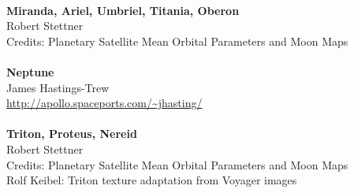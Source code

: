 \documentclass[Orbiter User Manual.tex]{subfiles}
\begin{document}
\\
\textbf{Miranda, Ariel, Umbriel, Titania, Oberon}\\
Robert Stettner\\
Credits: Planetary Satellite Mean Orbital Parameters and Moon Maps\\
\\
\textbf{Neptune}\\
James Hastings-Trew\\
\url{http://apollo.spaceports.com/~jhasting/}\\
\\
\textbf{Triton, Proteus, Nereid}\\
Robert Stettner\\
Credits: Planetary Satellite Mean Orbital Parameters and Moon Maps\\
Rolf Keibel: Triton texture adaptation from Voyager images
\end{document}
